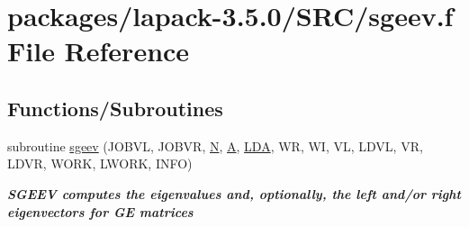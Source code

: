 \hypertarget{sgeev_8f}{}\section{packages/lapack-\/3.5.0/\+S\+R\+C/sgeev.f File Reference}
\label{sgeev_8f}
\subsection*{Functions/\+Subroutines}
\begin{DoxyCompactItemize}
\item 
subroutine \hyperlink{group__realGEeigen_ga104525b749278774f7b7f57195aa6798}{sgeev} (J\+O\+B\+V\+L, J\+O\+B\+V\+R, \hyperlink{polmisc_8c_a0240ac851181b84ac374872dc5434ee4}{N}, \hyperlink{classA}{A}, \hyperlink{example__user_8c_ae946da542ce0db94dced19b2ecefd1aa}{L\+D\+A}, W\+R, W\+I, V\+L, L\+D\+V\+L, V\+R, L\+D\+V\+R, W\+O\+R\+K, L\+W\+O\+R\+K, I\+N\+F\+O)
\begin{DoxyCompactList}\small\item\em {\bfseries  S\+G\+E\+E\+V computes the eigenvalues and, optionally, the left and/or right eigenvectors for G\+E matrices} \end{DoxyCompactList}\end{DoxyCompactItemize}
